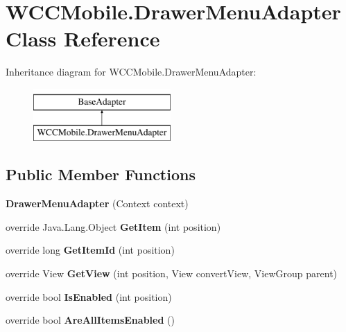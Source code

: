 \hypertarget{class_w_c_c_mobile_1_1_drawer_menu_adapter}{}\section{W\+C\+C\+Mobile.\+Drawer\+Menu\+Adapter Class Reference}
\label{class_w_c_c_mobile_1_1_drawer_menu_adapter}
Inheritance diagram for W\+C\+C\+Mobile.\+Drawer\+Menu\+Adapter\+:\begin{figure}[H]
\begin{center}
\leavevmode
\includegraphics[height=2.000000cm]{class_w_c_c_mobile_1_1_drawer_menu_adapter}
\end{center}
\end{figure}
\subsection*{Public Member Functions}
\begin{DoxyCompactItemize}
\item 
{\bfseries Drawer\+Menu\+Adapter} (Context context)\hypertarget{class_w_c_c_mobile_1_1_drawer_menu_adapter_ae1a0b37a2a1a30f8a0bb4c69893803cd}{}\label{class_w_c_c_mobile_1_1_drawer_menu_adapter_ae1a0b37a2a1a30f8a0bb4c69893803cd}

\item 
override Java.\+Lang.\+Object {\bfseries Get\+Item} (int position)\hypertarget{class_w_c_c_mobile_1_1_drawer_menu_adapter_afc38d1f1905b7ff184992c99602aff12}{}\label{class_w_c_c_mobile_1_1_drawer_menu_adapter_afc38d1f1905b7ff184992c99602aff12}

\item 
override long {\bfseries Get\+Item\+Id} (int position)\hypertarget{class_w_c_c_mobile_1_1_drawer_menu_adapter_a86d770733c700b289e44d6b6838ed2c2}{}\label{class_w_c_c_mobile_1_1_drawer_menu_adapter_a86d770733c700b289e44d6b6838ed2c2}

\item 
override View {\bfseries Get\+View} (int position, View convert\+View, View\+Group parent)\hypertarget{class_w_c_c_mobile_1_1_drawer_menu_adapter_a9ff22a632e5ecdff86a9e0e23dbf234d}{}\label{class_w_c_c_mobile_1_1_drawer_menu_adapter_a9ff22a632e5ecdff86a9e0e23dbf234d}

\item 
override bool {\bfseries Is\+Enabled} (int position)\hypertarget{class_w_c_c_mobile_1_1_drawer_menu_adapter_abdeac51f7a3e4461e4c2db93aed049e3}{}\label{class_w_c_c_mobile_1_1_drawer_menu_adapter_abdeac51f7a3e4461e4c2db93aed049e3}

\item 
override bool {\bfseries Are\+All\+Items\+Enabled} ()\hypertarget{class_w_c_c_mobile_1_1_drawer_menu_adapter_a74706ad66ad2ca6100ad0d2b9bf19b0d}{}\label{class_w_c_c_mobile_1_1_drawer_menu_adapter_a74706ad66ad2ca6100ad0d2b9bf19b0d}

\end{DoxyCompactItemize}
